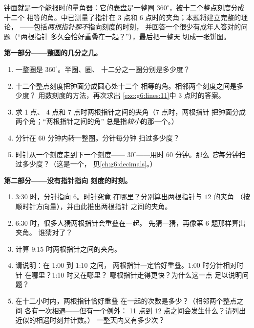 \begin{problem}
\label{pb:g6:lines:1}
钟面就是一个能报时的量角器：它的表盘是一整圈
$360^\circ$，被十二个整点刻度分成十二个
相等的角。中已测量了指针在
3 点和 6 点时的夹角；本题将建立完整的理论，
——包括\emph{两根指针都不}指向刻度的时刻，
并回答一个很少有成年人答对的问题（“两根指针
多久会恰好重叠在一起？”），最后把一整天
切成一张饼图。

\medskip
\noindent\textbf{第一部分——整圆的几分之几。}
\begin{enumerate}
  \item 一整圈是 $360^\circ$。半圈、圈、
        十二分之一圈分别是多少度？
  \item 十二个整点刻度把钟面分成圆心处十二个
        相等的角。相邻两个刻度之间是多少度？
        用数刻度的方法，再次求出
        \cref{exo:g6:lines:11}中 3 点时的答案。
  \item 求 1 点、
        4 点和 7 点时两根指针之间的夹角（7 点时，两根指针
        把钟面分成两个角；“两根指针之间的角”
        总是指\emph{较小}的那一个。）
  \item 分针在 $60$ 分钟内转一整圈。分针每分钟
        扫过多少度？
  \item 时针从一个刻度走到下一个刻度——
        $30^\circ$——用时 $60$ 分钟。那么
        \emph{它}每分钟扫过多少度？（这是一个，
        见\cref{ch:g6:decimals}。）
\end{enumerate}

\medskip
\noindent\textbf{第二部分——没有指针指向
刻度的时刻。}
\begin{enumerate}[resume]
  \item 3:30 时，分针指向 $6$。时针究竟
        在哪里？分别算出两根指针与 $12$ 的夹角
        （按顺时针方向量），并由此推出两根指针
        之间的夹角。
  \item 6:30 时，很多人猜两根指针会重叠在一起。
        先猜一猜，再像第 6 题那样算出夹角。
        谁猜对了？
  \item 计算 9:15 时两根指针之间的夹角。
  \item 请说明：在 1:00 到 1:10 之间，
        两根指针一定恰好重叠。1:00 时分针相对时针
        在哪里？1:10 时又在哪里？
        哪根指针走得更快？为什么这一点
        足以说明问题？
  \item 在十二小时内，两根指针恰好重叠
        在一起的次数是多少？（相邻两个整点之间
        各有一次相遇——但有一个例外：
        11 点到 12 点之间会发生什么？请列出
        近似的相遇时刻并计数。）
        一整天内又有多少次？
\end{enumerate}


\end{problem}

